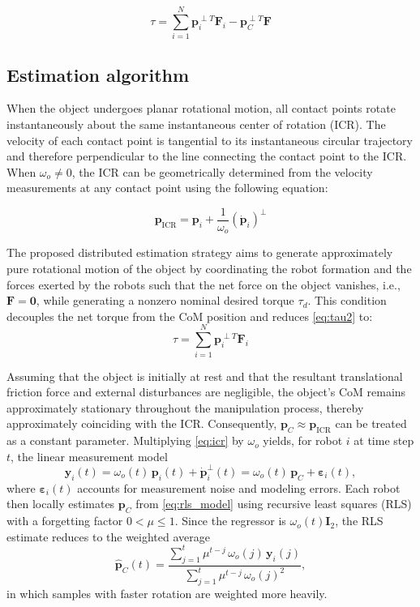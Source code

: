 \begin{equation}
\tau
=
\sum_{i=1}^{N}
\mathbf{p}_{i}^{\perp T}\mathbf{F}_{i}
-
\mathbf{p}_{C}^{\perp T}\mathbf{F}
\label{eq:tau2}
\end{equation}

\subsection{Estimation algorithm}

When the object undergoes planar rotational motion, all contact points rotate instantaneously about the same instantaneous center of rotation (ICR). The velocity of each contact point is tangential to its instantaneous circular trajectory and therefore perpendicular to the line connecting the contact point to the ICR. When $\omega_o\neq0$, the ICR can be geometrically determined from the velocity measurements at any contact point using the following equation:

\begin{equation}
\mathbf{p}_{\mathrm{ICR}}
=
\mathbf{p}_{i}
+
\frac{1}{\omega_o}
\left(\dot{\mathbf{p}}_{i}\right)^{\perp}
\label{eq:icr}
\end{equation}

The proposed distributed estimation strategy aims to generate approximately pure rotational motion of the object by coordinating the robot formation and the forces exerted by the robots such that the net force on the object vanishes, i.e., $\mathbf{F}=\mathbf{0}$, while generating a nonzero nominal desired torque $\tau_d$. This condition decouples the net torque from the CoM position and reduces \eqref{eq:tau2} to:
\begin{equation}
\tau
=
\sum_{i=1}^{N}
\mathbf{p}_{i}^{\perp T}\mathbf{F}_{i}
\label{eq:tau3}
\end{equation}

Assuming that the object is initially at rest and that the resultant translational friction force and external disturbances are negligible, the object's CoM remains approximately stationary throughout the manipulation process, thereby approximately coinciding with the ICR. Consequently, $\mathbf{p}_C \approx \mathbf{p}_{\mathrm{ICR}}$ can be treated as a constant parameter. Multiplying \eqref{eq:icr} by $\omega_o$ yields, for robot $i$ at time step $t$, the linear measurement model
\begin{equation}
\mathbf{y}_i(t)
=
\omega_o(t)\,\mathbf{p}_i(t)+\dot{\mathbf{p}}_i^{\perp}(t)
=
\omega_o(t)\,\mathbf{p}_C
+
\boldsymbol{\varepsilon}_i(t),
\label{eq:rls_model}
\end{equation}
where $\boldsymbol{\varepsilon}_i(t)$ accounts for measurement noise and modeling errors. Each robot then locally estimates $\mathbf{p}_C$ from \eqref{eq:rls_model} using recursive least squares (RLS) with a forgetting factor $0<\mu\leq1$. Since the regressor is $\omega_o(t)\mathbf{I}_2$, the RLS estimate reduces to the weighted average
\begin{equation}
\hat{\mathbf{p}}_C(t)
=
\frac{\sum_{j=1}^{t}\mu^{t-j}\,\omega_o(j)\,\mathbf{y}_i(j)}
{\sum_{j=1}^{t}\mu^{t-j}\,\omega_o(j)^2},
\label{eq:rls_estimate}
\end{equation}
in which samples with faster rotation are weighted more heavily.

